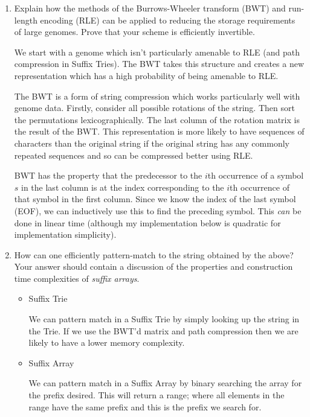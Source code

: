 \documentclass[10pt,\jkfside,a4paper]{article}
\begin{document}
\begin{enumerate}
    \item Explain how the  methods of the Burrows-Wheeler transform (BWT) and run-length encoding (RLE) can be applied to reducing the storage requirements of large genomes. Prove that your scheme is efficiently
    invertible.

    We start with a genome which isn't particularly amenable to RLE (and path compression in Suffix Tries)\@. The BWT takes this structure and creates a new representation which has a high probability of being
    amenable to RLE\@.

    The BWT is a form of string compression which works particularly well with genome data. Firstly, consider all possible rotations of the string. Then sort the permutations lexicographically. The
    last column of the rotation matrix is the result of the BWT\@. This representation is more likely to have sequences of characters than the original string if the original string has any commonly repeated
    sequences and so can be compressed better using RLE\@.

    BWT has the property that the predecessor to the $i$th occurrence of a symbol $s$ in the last column is at the index corresponding to the $i$th occurrence of that symbol in the first column. Since we know
    the index of the last symbol (EOF), we can inductively use this to find the preceding symbol. This \textit{can} be done in linear time (although my implementation below is quadratic for implementation
    simplicity).

    \item How can one efficiently pattern-match to the string obtained by the above? Your answer should contain a discussion of the properties and construction time complexities of \textit{suffix arrays}.

    \begin{itemize}

        \item Suffix Trie

        We can pattern match in a Suffix Trie by simply looking up the string in the Trie. If we use the BWT'd matrix and path compression then we are likely to have a lower memory complexity.

        \item Suffix Array

        We can pattern match in a Suffix Array by binary searching the array for the prefix desired. This will return a range; where all elements in the range have the same prefix and this is the prefix we
        search for.


\end{itemize}
\end{enumerate}
\end{document}
